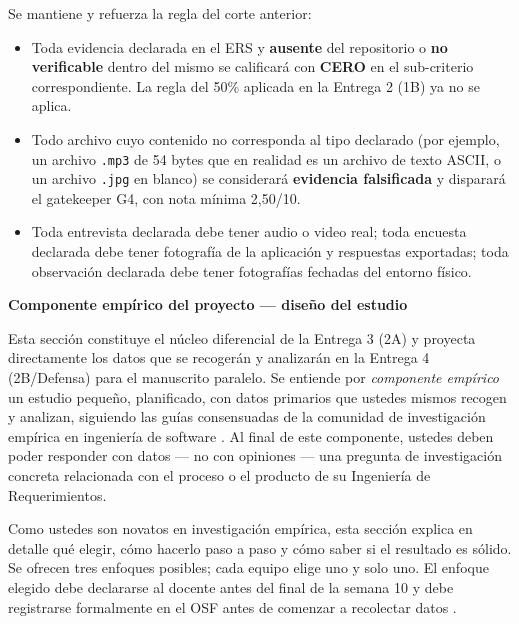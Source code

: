 \documentclass[11pt,a4paper]{article}
\newcounter{secc}
\newcommand{\secband}[1]{%
    \stepcounter{secc}\par\vspace{9pt}\noindent
    {\setlength{\fboxsep}{0pt}%
        \colorbox{uteqgold}{\parbox[c][20pt][c]{0.05\textwidth}{\centering\textbf{\color{white}\small \arabic{secc}}}}%
        \colorbox{uteqgreen}{\parbox[c][20pt][c]{0.95\textwidth}{\hspace{8pt}\textbf{\color{white}\small #1}}}%
    }\par\vspace{5pt}}
\begin{document}
\begin{alertbox}[title=Regla estricta de evidencias --- vigente desde esta entrega]
Se mantiene y refuerza la regla del corte anterior:
\begin{itemize}
    \item Toda evidencia declarada en el ERS y \textbf{ausente} del repositorio o \textbf{no verificable} dentro del mismo se calificará con \textbf{CERO} en el sub-criterio correspondiente. La regla del 50\% aplicada en la Entrega 2 (1B) ya no se aplica.
    \item Todo archivo cuyo contenido no corresponda al tipo declarado (por ejemplo, un archivo \texttt{.mp3} de 54 bytes que en realidad es un archivo de texto ASCII, o un archivo \texttt{.jpg} en blanco) se considerará \textbf{evidencia falsificada} y disparará el gatekeeper G4, con nota mínima 2,50/10.
    \item Toda entrevista declarada debe tener audio o video real; toda encuesta declarada debe tener fotografía de la aplicación y respuestas exportadas; toda observación declarada debe tener fotografías fechadas del entorno físico.
\end{itemize}
\end{alertbox}

\secband{Componente empírico del proyecto --- diseño del estudio}

Esta sección constituye el núcleo diferencial de la Entrega 3 (2A) y proyecta directamente los datos que se recogerán y analizarán en la Entrega 4 (2B/Defensa) para el manuscrito paralelo.
Se entiende por \emph{componente empírico} un estudio pequeño, planificado, con datos primarios que ustedes mismos recogen y analizan, siguiendo las guías consensuadas de la comunidad de investigación empírica en ingeniería de software \cite{jedlitschka2008reporting,runeson2009guidelines,wohlin2012experimentation}.
Al final de este componente, ustedes deben poder responder con datos --- no con opiniones --- una pregunta de investigación concreta relacionada con el proceso o el producto de su Ingeniería de Requerimientos.

Como ustedes son novatos en investigación empírica, esta sección explica en detalle qué elegir, cómo hacerlo paso a paso y cómo saber si el resultado es sólido.
Se ofrecen tres enfoques posibles; cada equipo elige uno y solo uno.
El enfoque elegido debe declararse al docente antes del final de la semana 10 y debe registrarse formalmente en el OSF antes de comenzar a recolectar datos \cite{nosek2018preregistration}.
\end{document}
